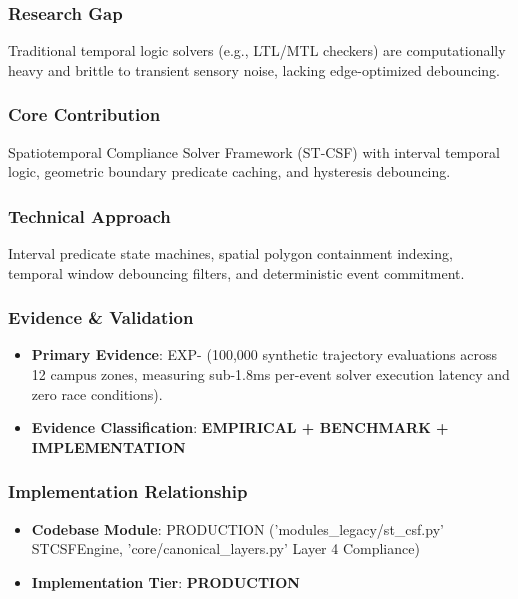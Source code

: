 \documentclass[11pt,letterpaper]{article}
\begin{document}
\subsubsection{Research Gap}
Traditional temporal logic solvers (e.g., LTL/\allowbreak MTL checkers) are computationally heavy and brittle to transient sensory noise, lacking edge-\allowbreak optimized debouncing.

\subsubsection{Core Contribution}
Spatiotemporal Compliance Solver Framework (ST-\allowbreak CSF) with interval temporal logic, geometric boundary predicate caching, and hysteresis debouncing.

\subsubsection{Technical Approach}
Interval predicate state machines, spatial polygon containment indexing, temporal window debouncing filters, and deterministic event commitment.

\subsubsection{Evidence \& Validation}
\begin{itemize}[leftmargin=*]
    \item \textbf{Primary Evidence}: EXP- (100,000 synthetic trajectory evaluations across 12 campus zones, measuring sub-\allowbreak 1.8ms per-\allowbreak event solver execution latency and zero race conditions).
    \item \textbf{Evidence Classification}: \textbf{EMPIRICAL + BENCHMARK + IMPLEMENTATION}
\end{itemize}

\subsubsection{Implementation Relationship}
\begin{itemize}[leftmargin=*]
    \item \raggedright \textbf{Codebase Module}: PRODUCTION ('modules\_\allowbreak legacy/\allowbreak st\_\allowbreak csf.py' STCSFEngine, 'core/\allowbreak canonical\_\allowbreak layers.py' Layer 4 Compliance)
    \item \textbf{Implementation Tier}: \textbf{PRODUCTION}
\end{itemize}
\end{document}
